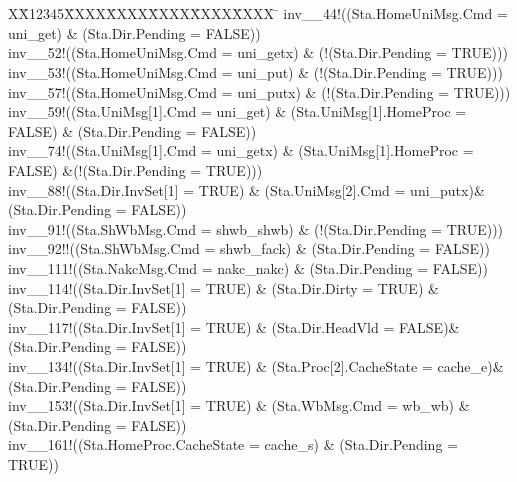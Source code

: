 \documentclass{llncs-new}
\newlength{\fminilength}
\newenvironment{fmini}[1][\linewidth]
  {\setlength{\fminilength}{#1\fboxsep-2\fboxrule}%
   \vspace{2ex}\noindent\begin{lrbox}{\fminibox}\begin{minipage}{\fminilength}%
   \mbox{ }\hfill\vspace{-2.5ex}}%
  {\end{minipage}\end{lrbox}\vspace{1ex}\hspace{0ex}%
   \framebox{\usebox{\fminibox}}}
\newenvironment{specification}
{\noindent\scriptsize
\tt\begin{fmini}\begin{tabbing}X\=X12345\=XXXX\=XXXX\=XXXX\=XXXX\=XXXX
\=\+\kill} {\end{tabbing}\normalfont\end{fmini}}
\begin{document}
\begin{specification}
inv\_\_44!((Sta.HomeUniMsg.Cmd = uni\_get) \& (Sta.Dir.Pending = FALSE))\\
inv\_\_52!((Sta.HomeUniMsg.Cmd = uni\_getx) \& (!(Sta.Dir.Pending = TRUE)))\\
inv\_\_53!((Sta.HomeUniMsg.Cmd = uni\_put) \& (!(Sta.Dir.Pending = TRUE)))\\
inv\_\_57!((Sta.HomeUniMsg.Cmd = uni\_putx) \& (!(Sta.Dir.Pending = TRUE)))\\
inv\_\_59!((Sta.UniMsg[1].Cmd = uni\_get) \& (Sta.UniMsg[1].HomeProc = FALSE) \& (Sta.Dir.Pending = FALSE))\\
inv\_\_74!((Sta.UniMsg[1].Cmd = uni\_getx) \& (Sta.UniMsg[1].HomeProc = FALSE) \&(!(Sta.Dir.Pending = TRUE)))\\
inv\_\_88!((Sta.Dir.InvSet[1] = TRUE)  \& (Sta.UniMsg[2].Cmd = uni\_putx)\& (Sta.Dir.Pending = FALSE))\\
inv\_\_91!((Sta.ShWbMsg.Cmd = shwb\_shwb) \& (!(Sta.Dir.Pending = TRUE)))\\
inv\_\_92!!((Sta.ShWbMsg.Cmd = shwb\_fack) \& (Sta.Dir.Pending = FALSE))\\
inv\_\_111!((Sta.NakcMsg.Cmd = nakc\_nakc) \& (Sta.Dir.Pending = FALSE))\\
inv\_\_114!((Sta.Dir.InvSet[1] = TRUE) \& (Sta.Dir.Dirty = TRUE) \& (Sta.Dir.Pending = FALSE))\\
inv\_\_117!((Sta.Dir.InvSet[1] = TRUE)  \& (Sta.Dir.HeadVld = FALSE)\& (Sta.Dir.Pending = FALSE))\\
inv\_\_134!((Sta.Dir.InvSet[1] = TRUE)  \& (Sta.Proc[2].CacheState = cache\_e)\& (Sta.Dir.Pending = FALSE))\\
inv\_\_153!((Sta.Dir.InvSet[1] = TRUE) \& (Sta.WbMsg.Cmd = wb\_wb) \& (Sta.Dir.Pending = FALSE))\\
inv\_\_161!((Sta.HomeProc.CacheState = cache\_s) \& (Sta.Dir.Pending = TRUE))
\end{specification}
\end{document}
